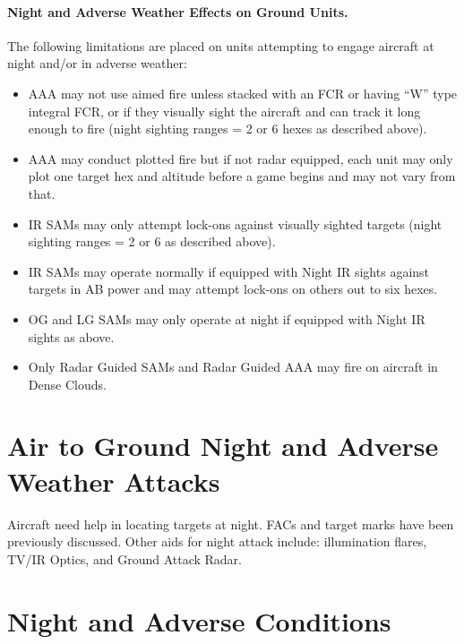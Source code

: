 \begin{advancedrules}
{\paragraph{Night and Adverse Weather Effects on Ground Units.} The following limitations are placed on units attempting to engage aircraft at night and/or in adverse weather:

\begin{itemize}

    \item AAA may not use aimed fire unless stacked with an FCR or having “W” type integral FCR, or if they visually sight the aircraft and can track it long enough to fire (night sighting ranges = 2 or 6 hexes as described above).

    \item AAA may conduct plotted fire but if not radar equipped, each unit may only plot one target hex and altitude before a game begins and may not vary from that.

    \item IR SAMs may only attempt lock-ons against visually sighted targets (night sighting ranges = 2 or 6 as described above).

    \item IR SAMs may operate normally if equipped with Night IR sights against targets in AB power and may attempt lock-ons on others out to six hexes.

    \item OG and LG SAMs may only operate at night if equipped with Night IR sights as above.

    \item Only Radar Guided SAMs and Radar Guided AAA may fire on aircraft in Dense Clouds.

\end{itemize}

\section{Air to Ground Night and Adverse Weather Attacks}

Aircraft need help in locating targets at night. FACs and target marks have been previously discussed. Other aids for night attack include: illumination flares, TV/IR Optics, and Ground Attack Radar.

}{

\section{Night and Adverse Conditions}
\label{rule:night-and-adverse-weather-flight}
\label{rule:adverse-conditions}
\label{rule:night}

}
\end{advancedrules}
